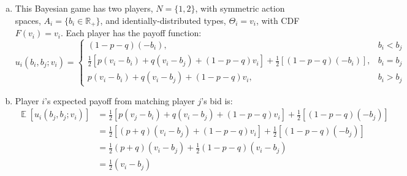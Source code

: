 \documentclass{article}
\newcommand{\R}{\mathbb{R}}
\DeclareMathOperator{\E}{\mathbb{E}}%
\begin{document}
\begin{enumerate}[(a)]
	\item This Bayesian game has two players, ${N=\{1,2\}}$, with symmetric action spaces, ${A_i=\{b_i\in\R_+\}}$, and identially-distributed types, ${\Theta_i=v_i}$, with CDF ${F(v_i)=v_i}$. Each player has the payoff function:
		\[
			u_i(b_i,b_j;v_i) = \begin{cases}
									(1-p-q)(-b_i), 																							& b_i < b_j 	\\
									\frac{1}{2}\left[p(v_i-b_i) + q(v_i-b_j) + (1-p-q)v_i\right] + \frac{1}{2}\left[(1-p-q)(-b_i)\right], 	& b_i = b_j 	\\
									p(v_i-b_i) + q(v_i-b_j) + (1-p-q)v_i, 																	& b_i > b_j
								\end{cases}
		\]
		
	\item Player $i$'s expected payoff from matching player $j$'s bid is:
		\begin{align*}
			\E\left[u_i(b_j,b_j;v_i)\right] &= \frac{1}{2}\left[p(v_j-b_i) + q(v_i-b_j) + (1-p-q)v_i\right] + \frac{1}{2}\left[(1-p-q)(-b_j)\right]	\\
											&= \frac{1}{2}\left[(p + q)(v_i-b_j) + (1-p-q)v_i\right] + \frac{1}{2}\left[(1-p-q)(-b_j)\right]		\\
											&= \frac{1}{2}(p + q)(v_i-b_j) + \frac{1}{2}(1-p-q)(v_i-b_j)											\\
											&= \frac{1}{2}(v_i-b_j)
		\end{align*}
	

\end{enumerate}
\end{document}
